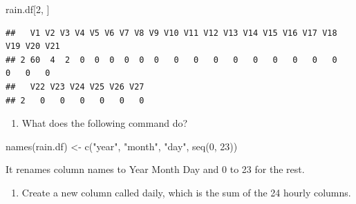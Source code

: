 \documentclass[
]{article}
\newenvironment{Shaded}{\begin{snugshade}}{\end{snugshade}}
\newcommand{\DecValTok}[1]{\textcolor[rgb]{0.00,0.00,0.81}{#1}}
\newcommand{\FunctionTok}[1]{\textcolor[rgb]{0.00,0.00,0.00}{#1}}
\newcommand{\NormalTok}[1]{#1}
\newcommand{\OtherTok}[1]{\textcolor[rgb]{0.56,0.35,0.01}{#1}}
\newcommand{\StringTok}[1]{\textcolor[rgb]{0.31,0.60,0.02}{#1}}
\providecommand{\tightlist}{%
  \setlength{\itemsep}{0pt}\setlength{\parskip}{0pt}}
\begin{document}
\begin{Shaded}
\begin{Highlighting}[]
\NormalTok{rain.df[}\DecValTok{2}\NormalTok{, ]}
\end{Highlighting}
\end{Shaded}

\begin{verbatim}
##   V1 V2 V3 V4 V5 V6 V7 V8 V9 V10 V11 V12 V13 V14 V15 V16 V17 V18 V19 V20 V21
## 2 60  4  2  0  0  0  0  0  0   0   0   0   0   0   0   0   0   0   0   0   0
##   V22 V23 V24 V25 V26 V27
## 2   0   0   0   0   0   0
\end{verbatim}

\begin{enumerate}
\def\labelenumi{\alph{enumi}.}
\setcounter{enumi}{5}
\tightlist
\item
  What does the following command do?
\end{enumerate}

\begin{Shaded}
\begin{Highlighting}[]
\FunctionTok{names}\NormalTok{(rain.df) }\OtherTok{\textless{}{-}} \FunctionTok{c}\NormalTok{(}\StringTok{"year"}\NormalTok{, }\StringTok{"month"}\NormalTok{, }\StringTok{"day"}\NormalTok{, }\FunctionTok{seq}\NormalTok{(}\DecValTok{0}\NormalTok{, }\DecValTok{23}\NormalTok{))}
\end{Highlighting}
\end{Shaded}

It renames column names to Year Month Day and 0 to 23 for the rest.

\begin{enumerate}
\def\labelenumi{\alph{enumi}.}
\setcounter{enumi}{6}
\tightlist
\item
  Create a new column called daily, which is the sum of the 24 hourly
  columns.
\end{enumerate}
\end{document}

